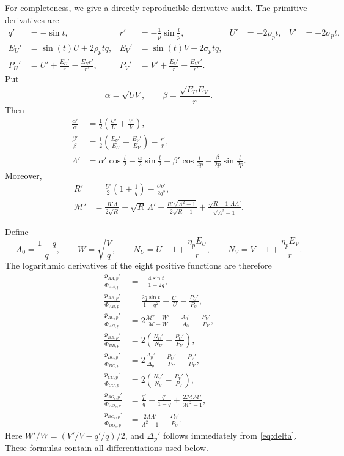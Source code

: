 \documentclass{amsart}
\begin{document}
For completeness, we give a directly reproducible derivative audit.  The
primitive derivatives are
\begin{align*}
 q'&=-\sin t,&r'&=-\frac1p\sin\frac tp,
 &U'&=-2\rho_pt,&V'&=-2\sigma_pt,\\
 E_U'&=\sin(t)U+2\rho_ptq,
 &E_V'&=\sin(t)V+2\sigma_ptq,\\
 P_U'&=U'+\frac{E_U'}r-\frac{E_Ur'}{r^2},
 &P_V'&=V'+\frac{E_V'}r-\frac{E_Vr'}{r^2}.
\end{align*}
Put
\[
 \alpha=\sqrt{UV},\qquad
 \beta=\frac{\sqrt{E_UE_V}}r.
\]
Then
\begin{align*}
 \frac{\alpha'}\alpha&=\frac12\left(\frac{U'}U+\frac{V'}V\right),\\
 \frac{\beta'}\beta&=\frac12\left(\frac{E_U'}{E_U}
 +\frac{E_V'}{E_V}\right)-\frac{r'}r,\\
 \Lambda'&=\alpha'\cos\frac t2-\frac\alpha2\sin\frac t2
 +\beta'\cos\frac{t}{2p}-\frac\beta{2p}\sin\frac{t}{2p}.
\end{align*}
Moreover,
\begin{align*}
 R'&=\frac{U'}2\left(1+\frac1q\right)-\frac{Uq'}{2q^2},\\
 \mathcal M'&=\frac{R'\Lambda}{2\sqrt R}+\sqrt R\,\Lambda'
 +\frac{R'\sqrt{\Lambda^2-1}}{2\sqrt{R-1}}
 +\frac{\sqrt{R-1}\,\Lambda\Lambda'}{\sqrt{\Lambda^2-1}}.
\end{align*}

Define
\[
 A_0=\frac{1-q}{q},\qquad W=\sqrt{\frac Vq},
 \qquad N_U=U-1+\frac{\eta_pE_U}{r},
 \qquad N_V=V-1+\frac{\eta_pE_V}{r}.
\]
The logarithmic derivatives of the eight positive functions are therefore
\begin{align*}
 \frac{\Phi_{AA,p}'}{\Phi_{AA,p}}
 &=-\frac{4\sin t}{1+2q},\\
 \frac{\Phi_{AB,p}'}{\Phi_{AB,p}}
 &=\frac{2q\sin t}{1-q^2}+\frac{U'}U-\frac{P_U'}{P_U},\\
 \frac{\Phi_{AC,p}'}{\Phi_{AC,p}}
 &=2\frac{\mathcal M'-W'}{\mathcal M-W}
 -\frac{A_0'}{A_0}-\frac{P_V'}{P_V},\\
 \frac{\Phi_{BB,p}'}{\Phi_{BB,p}}
 &=2\left(\frac{N_U'}{N_U}-\frac{P_U'}{P_U}\right),\\
 \frac{\Phi_{BC,p}'}{\Phi_{BC,p}}
 &=2\frac{\Delta_p'}{\Delta_p}-\frac{P_U'}{P_U}-\frac{P_V'}{P_V},\\
 \frac{\Phi_{CC,p}'}{\Phi_{CC,p}}
 &=2\left(\frac{N_V'}{N_V}-\frac{P_V'}{P_V}\right),\\
 \frac{\Phi_{AO_c,p}'}{\Phi_{AO_c,p}}
 &=\frac{q'}q+\frac{q'}{1-q}
 +\frac{2\mathcal M\mathcal M'}{\mathcal M^2-1},\\
 \frac{\Phi_{BO_c,p}'}{\Phi_{BO_c,p}}
 &=\frac{2\Lambda\Lambda'}{\Lambda^2-1}-\frac{P_U'}{P_U}.
\end{align*}
Here \(W'/W=(V'/V-q'/q)/2\), and \(\Delta_p'\) follows immediately
from \eqref{eq:delta}.  These formulas contain all differentiations used
below.
\end{document}
